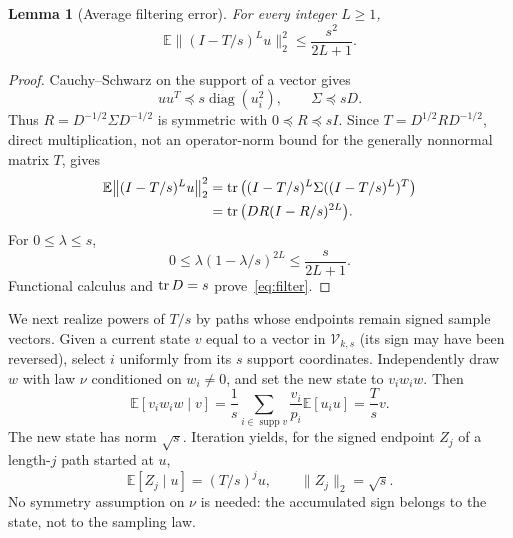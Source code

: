 \documentclass[11pt]{article}
\newtheorem{lemma}[theorem]{Lemma}
\theoremstyle{remark}\newtheorem{remark}[theorem]{Remark}
\newcommand{\E}{\mathbb E}\newcommand{\PP}{\mathbb P}
\newcommand{\diag}{\operatorname{diag}}\newcommand{\rank}{\operatorname{rank}}
\newcommand{\supp}{\operatorname{supp}}
\begin{document}
\begin{lemma}[Average filtering error]\label{lem:filter}
For every integer $L\ge1$,
\begin{equation}\label{eq:filter}
 \E\big\|(I-T/s)^L u\big\|_2^2\le\frac{s^2}{2L+1}.
\end{equation}
\end{lemma}
\begin{proof}
Cauchy--Schwarz on the support of a vector gives
\[
 uu^T\preceq s\diag(u_i^2),\qquad \Sigma\preceq sD.
\]
Thus $R=D^{-1/2}\Sigma D^{-1/2}$ is symmetric with $0\preceq R\preceq sI$. Since $T=D^{1/2}RD^{-1/2}$, direct multiplication, not an operator-norm bound for the generally nonnormal matrix $T$, gives
\begin{align*}
 \E\big\|(I-T/s)^L u\big\|_2^2
 &=\tr\big((I-T/s)^L\Sigma((I-T/s)^L)^T\big)\\
 &=\tr\big(DR(I-R/s)^{2L}\big).
\end{align*}
For $0\le\lambda\le s$,
\[
 0\le\lambda(1-\lambda/s)^{2L}\le\frac{s}{2L+1}.
\]
Functional calculus and $\operatorname{tr} D=s$ prove~\eqref{eq:filter}.
\end{proof}

We next realize powers of $T/s$ by paths whose endpoints remain signed sample vectors. Given a current state $v$ equal to a vector in $\mathcal V_{k,s}$ (its sign may have been reversed), select $i$ uniformly from its $s$ support coordinates. Independently draw $w$ with law $\nu$ conditioned on $w_i\ne0$, and set the new state to $v_iw_iw$. Then
\begin{equation}\label{eq:transition}
 \E[v_iw_iw\mid v]
 =\frac1s\sum_{i\in\supp v}\frac{v_i}{p_i}\E[u_i u]
 =\frac Ts v.
\end{equation}
The new state has norm $\sqrt s$. Iteration yields, for the signed endpoint $Z_j$ of a length-$j$ path started at $u$,
\begin{equation}\label{eq:paths}
 \E[Z_j\mid u]=(T/s)^j u,\qquad \|Z_j\|_2=\sqrt s.
\end{equation}
No symmetry assumption on $\nu$ is needed: the accumulated sign belongs to the state, not to the sampling law.
\end{document}
